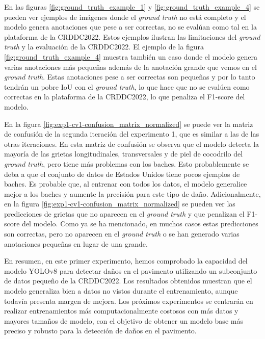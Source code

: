 En las figuras \ref{fig:ground_truth_example_1} y \ref{fig:ground_truth_example_4} se pueden ver ejemplos de imágenes donde el \textit{ground truth} no está completo y el modelo genera anotaciones que pese a ser correctas, no se evalúan como tal en la plataforma de la CRDDC2022. Estos ejemplos ilustran las limitaciones del \textit{ground truth} y la evaluación de la CRDDC2022. El ejemplo de la figura \ref{fig:ground_truth_example_4} muestra también un caso donde el modelo genera varias anotaciones más pequeñas además de la anotación grande que vemos en el \textit{ground truth}. Estas anotaciones pese a ser correctas son pequeñas y por lo tanto tendrán un pobre IoU con el \textit{ground truth}, lo que hace que no se evalúen como correctas en la plataforma de la CRDDC2022, lo que penaliza el F1-score del modelo.

En la figura \ref{fig:exp1-cv1-confusion_matrix_normalized} se puede ver la matriz de confusión de la segunda iteración del experimento 1, que es similar a las de las otras iteraciones. En esta matriz de confusión se observa que el modelo detecta la mayoría de las grietas longitudinales, transversales y de piel de cocodrilo del \textit{ground truth}, pero tiene más problemas con los baches. Esto probablemente se deba a que el conjunto de datos de Estados Unidos tiene pocos ejemplos de baches. Es probable que, al entrenar con todos los datos, el modelo generalice mejor a los baches y aumente la precisión para este tipo de daño. Adicionalmente, en la figura \ref{fig:exp1-cv1-confusion_matrix_normalized} se pueden ver las predicciones de grietas que no aparecen en el \textit{ground truth} y que penalizan el F1-score del modelo. Como ya se ha mencionado, en muchos casos estas predicciones son correctas, pero no aparecen en el \textit{ground truth} o se han generado varias anotaciones pequeñas en lugar de una grande.

En resumen, en este primer experimento, hemos comprobado la capacidad del modelo YOLOv8 para detectar daños en el pavimento utilizando un subconjunto de datos pequeño de la CRDDC2022. Los resultados obtenidos muestran que el modelo generaliza bien a datos no vistos durante el entrenamiento, aunque todavía presenta margen de mejora. Los próximos experimentos se centrarán en realizar entrenamientos más computacionalmente costosos con más datos y mayores tamaños de modelo, con el objetivo de obtener un modelo base más preciso y robusto para la detección de daños en el pavimento.

